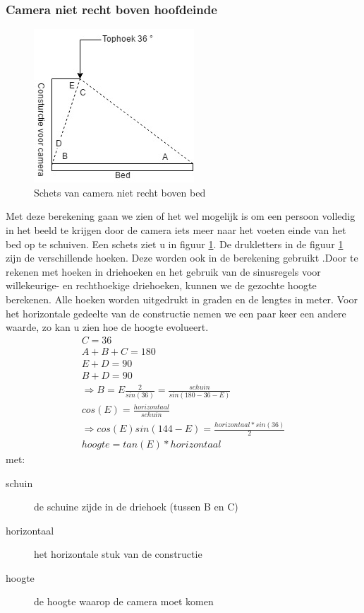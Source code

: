 \subsubsection{Camera niet recht boven hoofdeinde}
\begin{figure}[hbp]
	\includegraphics[scale=0.7]{CameraNietRechtBoven}
	\caption{Schets van camera niet recht boven bed}
	\label{imgCNRBB}
\end{figure}
Met deze berekening gaan we zien of het wel mogelijk is om een persoon volledig in het beeld te krijgen door de camera iets meer naar het voeten einde van het bed op te schuiven. Een schets ziet u in figuur \ref{imgCNRBB}. De drukletters in de figuur \ref{imgCNRBB} zijn de verschillende hoeken. Deze worden ook in de berekening gebruikt .Door te rekenen met hoeken in driehoeken en het gebruik van de sinusregels voor willekeurige- en rechthoekige driehoeken, kunnen we de gezochte hoogte berekenen. Alle hoeken worden uitgedrukt in graden en de lengtes in meter. Voor het horizontale gedeelte van de constructie nemen we een paar keer een andere waarde, zo kan u zien hoe de hoogte evolueert.
\begin{gather}
C=36\\
A+B+C=180 \\
E+D=90 \\
B+D=90 \\
\Rightarrow B=E
\frac{2}{sin(36)}=\frac{schuin}{sin(180-36-E)}\\
cos(E)=\frac{horizontaal}{schuin}\\
\Rightarrow cos(E)sin(144-E)=\frac{horizontaal*sin(36)}{2}\\
hoogte=tan(E)*horizontaal
\end{gather}
met:
\begin{description}
	\item[schuin] de schuine zijde in de driehoek (tussen B en C)
	\item[horizontaal] het horizontale stuk van de constructie
	\item[hoogte] de hoogte waarop de camera moet komen
\end{description}
